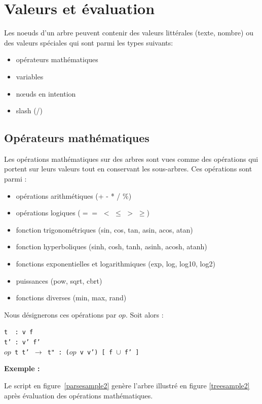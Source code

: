 \documentclass{article}
\newcommand{\exemple}	{\vspace*{1mm}\hspace*{-4mm}\textbf{Exemple :}}
\newcommand{\op}	[1]		{\vspace{0mm}\begin{center}\colorbox{mygrey}{
							\begin{minipage}[t]{0.9\columnwidth} 
							{\small \texttt{#1}}
							\end{minipage}}\end{center}}
\newcommand{\binop}		{$op$}
\begin{document}
\section{Valeurs et évaluation}\label{sec:valeurs}

Les noeuds d'un arbre peuvent contenir des valeurs littérales (texte, nombre) ou des valeurs spéciales qui sont parmi les types suivants:
\begin{itemize}
\item opérateurs mathématiques
\item variables
\item nœuds en intention
\item slash (/)
\end{itemize}


\subsection{Opérateurs mathématiques}

Les opérations mathématiques sur des arbres sont vues comme des opérations qui portent sur leurs valeurs tout en conservant les sous-arbres. Ces opérations sont parmi :
\begin{itemize}
\item opérations arithmétiques (+ - * / \%)
\item opérations logiques ($==$ $<$ $\leq$ $>$ $\geq$)
\item fonction trigonométriques (sin, cos, tan, asin, acos, atan)
\item fonction hyperboliques (sinh, cosh, tanh, asinh, acosh, atanh)
\item fonctions exponentielles et logarithmiques (exp, log, log10, log2)
\item puissances (pow, sqrt, cbrt)
\item fonctions diverses (min, max, rand)
\end{itemize}

Nous désignerons ces opérations par \binop. Soit alors :
\op{t \ :  v f\\
t' : v' f'\\
\binop\ t t'  $\to$  t" : (\binop\ v v') [ f $\cup$ f' ]  
}

\exemple

Le script en figure~\ref{parsesample2} genère l'arbre illustré en figure \ref{treesample2} après évaluation des opérations mathématiques.
\end{document}
